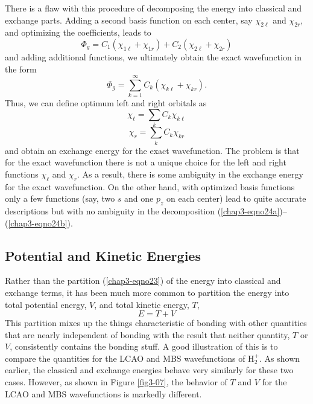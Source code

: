 There is a flaw with this procedure of decomposing the energy into 
classical and exchange parts. Adding a second basis function on each 
center, say $\chi_{2\ell}$ and $\chi_{2r}$, and optimizing the coefficients, 
leads to
\begin{equation}
\Phi_g = C_1 \left( \chi_{1\ell} + \chi_{1r} \right) + C_2 \left( 
\chi_{2\ell} + \chi_{2r} \right)
\end{equation}
and adding additional functions, we ultimately obtain the exact 
wavefunction in the form
\begin{equation}
\Phi_g = \sum^{\infty}_{k=1} C_k \left( \chi_{k\ell} + \chi_{kr} \right) .
\end{equation}
Thus, we can define optimum left and right orbitals as
\begin{equation}
\chi_\ell = \sum_{k} C_k \chi_{k\ell}
\label{chap3-eqno24a}
\end{equation}
\begin{equation}
\chi_r = \sum_{k} C_k \chi_{kr}
\label{chap3-eqno24b}
\end{equation}
and obtain an exchange energy for the exact wavefunction.  The problem
is that for the exact wavefunction there is not a unique choice for
the left and right functions $\chi_\ell$ and $\chi_r$.  As a result,
there is some ambiguity in the exchange energy for the exact
wavefunction.  On the other hand, with optimized basis functions only
a few functions (say, two $s$ and one $p_z$ on each center) lead to
quite accurate descriptions but with no ambiguity in the decomposition
(\ref{chap3-eqno24a})--(\ref{chap3-eqno24b}).


\subsection{Potential and Kinetic Energies}

Rather than the partition (\ref{chap3-eqno23}) of the energy into
classical and exchange terms, it has been much more common to
partition the energy into total potential energy, $V$, and total
kinetic energy, $T$,
\begin{equation}
E = T + V
\label{chap3-eqno25}
\end{equation}
This partition mixes up the things characteristic of
bonding with other quantities that are nearly independent of bonding
with the result that neither quantity, $T$ or $V$, consistently
contains the bonding stuff.  A good illustration of this is to compare
the quantities for the LCAO and MBS
wavefunctions of H$^+_2$.  As shown earlier, the classical and
exchange energies behave very similarly for these two cases.  However,
as shown in Figure \ref{fig3-07}, the behavior of $T$ and $V$ for the
LCAO and MBS wavefunctions is
markedly different.

